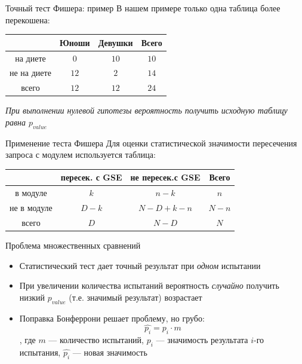 \documentclass[10pt,pdf,utf8,russian,aspectratio=169]{beamer}
\begin{document}
\begin{frame}{Точный тест Фишера: пример}
    В нашем примере только одна таблица более перекошена:
    \begin{table}[!ht]
        \centering
        \begin{tabular}{c|c|c|c}
                 & Юноши   & Девушки &  Всего \\ \hline
        на диете & $0$     & $10$     & $10$ \\ \hline
     не на диете & $12$     & $2$     & $14$ \\ \hline
           всего & $12$ & $12$ & $24$ \\
        \end{tabular}
    \end{table}
    \emph{
        При выполнении нулевой гипотезы вероятность получить исходную таблицу равна $p_{value}$
    }
\end{frame}

\begin{frame}{Применение теста Фишера}
    Для оценки статистической значимости пересечения запроса с модулем используется таблица:
     \begin{table}[!ht]
        \centering
        \begin{tabular}{c|c|c|c}
                 & пересек. с GSE & не пересек.с GSE & Всего \\  \hline
        в модуле & $k$            & $n - k$          & $n$ \\ \hline
     не в модуле & $D - k$        & $N - D + k - n$  & $N - n$ \\ \hline
           всего & $D$            & $N - D$          & $N$ \\
        \end{tabular}
    \end{table}
\end{frame}

\begin{frame}{Проблема множественных сравнений}
  \begin{itemize}[<+->]
    \item Статистический тест дает точный результат при \emph{одном} испытании
    \item При увеличении количества испытаний вероятность \emph{случайно} получить низкий $p_{value}$ (т.е. значимый результат) возрастает
    \item Поправка Бонферрони решает проблему, но грубо:
    $$\hat{p_i} = p_i \cdot m$$, где $m$ --- количество испытаний, $p_i$ --- значимость результата $i$-го испытания, $\hat{p_i}$ --- новая значимость
  \end{itemize}
\end{frame}
\end{document}
